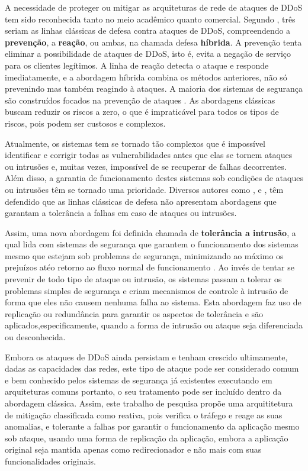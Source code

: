 
A necessidade de proteger ou mitigar as arquiteturas de rede de ataques de DDoS tem sido reconhecida tanto no meio acadêmico quanto comercial. Segundo \cite{1039856}, três seriam as linhas clássicas de defesa contra ataques de DDoS, compreendendo a \textbf{prevenção}, a \textbf{reação}, ou ambas, na chamada defesa \textbf{híbrida}. A prevenção tenta eliminar a possibilidade de ataques de DDoS, isto é, evita a negação de serviço para os clientes legítimos. A linha de reação detecta o ataque e responde imediatamente, e a abordagem híbrida combina os métodos anteriores, não só prevenindo mas também reagindo à ataques. A maioria dos sistemas de segurança são construídos focados na prevenção de ataques \cite{4429182}. As abordagens clássicas buscam reduzir os riscos a zero, o que é impraticável para todos os tipos de riscos, pois podem ser custosos e complexos.

Atualmente, os sistemas tem se tornado tão complexos que é impossível identificar e corrigir todas as vulnerabilidades antes que elas se tornem ataques ou intrusões e, muitas vezes, impossível de se recuperar de falhas decorrentes. Além disso, a garantia de funcionamento destes sistemas sob condições de ataques ou intrusões têm se tornado uma prioridade. Diversos autores como \cite{Verissimo},
 \cite{4796927} e \cite{1424871}, têm defendido que as linhas clássicas de defesa não apresentam abordagens que garantam a tolerância a falhas em caso de ataques ou intrusões.
  
 Assim, uma nova abordagem foi definida chamada de \textbf{tolerância a intrusão}, a qual lida com sistemas de segurança que garantem o funcionamento dos sistemas mesmo que estejam sob problemas de segurança, minimizando ao máximo os prejuízos atéo retorno ao fluxo normal de funcionamento \cite{Fraga_Powell_1985}. Ao invés de tentar se prevenir de todo tipo de ataque ou intrusão, os sistemas passam a tolerar os problemas simples de segurança e criam mecanismos de controle à intrusão  de forma que eles não causem nenhuma falha ao sistema. Esta abordagem faz uso de replicação ou redundância para garantir os aspectos de tolerância e são aplicados,especificamente, quando a forma de intrusão ou ataque seja diferenciada ou desconhecida. 

Embora os ataques de DDoS ainda persistam e tenham crescido ultimamente, dadas as capacidades das redes, este tipo de ataque pode ser considerado comum e bem conhecido pelos sistemas de segurança já existentes executando em arquiteturas comuns portanto, o seu tratamento pode ser incluído dentro da abordagem clássica. Assim, este trabalho de pesquisa propõe uma arquititetura de mitigação classificada como reativa, pois verifica o tráfego e reage as suas anomalias, e tolerante a falhas por garantir o funcionamento da aplicação mesmo sob ataque, usando uma forma de replicação da aplicação, embora a aplicação original seja mantida apenas como redirecionador e não mais com suas funcionalidades originais.


